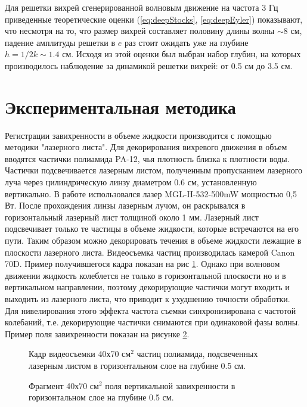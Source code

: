 Для решетки вихрей сгенерированной волновым движение на частота 3 Гц приведенные теоретические оценки (\ref{eq:deepStocks}, \ref{eq:deepEyler}) показывают, что несмотря на то, что размер вихрей составляет половину длины волны $\sim 8$ см, падение амплитуды решетки в $e$ раз стоит ожидать уже на глубине $h = 1/2k \sim 1.4$ см. Исходя из этой оценки был выбран набор глубин, на которых производилось наблюдение за динамикой решетки вихрей: от 0.5 см до 3.5 см.

\section{Экспериментальная методика} \label{sect6_2}
Регистрации завихренности в объеме жидкости производится с помощью методики "лазерного листа". Для декорирования вихревого движения в объем вводятся частички полиамида PA-12, чья плотность близка к плотности воды. Частички подсвечивается лазерным листом, полученным пропусканием лазерного луча через цилиндрическую линзу диаметром 0.6 см, установленную вертикально. В работе использовался лазер MGL-H-532-500mW мощностью 0,5 Вт. После прохождения линзы лазерным лучом, он раскрывался в горизонтальный лазерный лист толщиной около 1 мм. Лазерный лист подсвечивает только те частицы в объеме жидкости, которые встречаются на его пути. Таким образом можно декорировать течения в объеме жидкости лежащие в плоскости лазерного листа. Видеосъемка частиц производилась камерой Canon 70D. Пример получившегося кадра показан на рис \ref{img:track0p5cm}. Однако при волновом движении жидкость колеблется не только в горизонтальной плоскости но и в вертикальном направлении, поэтому декорирующие частички могут входить и выходить из лазерного листа, что приводит к ухудшению точности обработки. Для нивелирования этого эффекта частота съемки синхронизирована с частотой колебаний, т.е. декорирующие частички снимаются при одинаковой фазы волны. Пример поля завихренности показан на рисунке \ref{img:vort0p5cm}.
\begin{figure}[ht]
 \caption{Кадр видеосъемки 40х70 см$^2$ частиц полиамида, подсвеченных лазерным листом в горизонтальном слое на глубине 0.5 см.}
 \label{img:track0p5cm} 
\end{figure}

\begin{figure}[ht]
 \caption{Фрагмент 40х70 см$^2$ поля вертикальной завихренности в горизонтальном слое на глубине 0.5 см.}
 \label{img:vort0p5cm} 
\end{figure}


